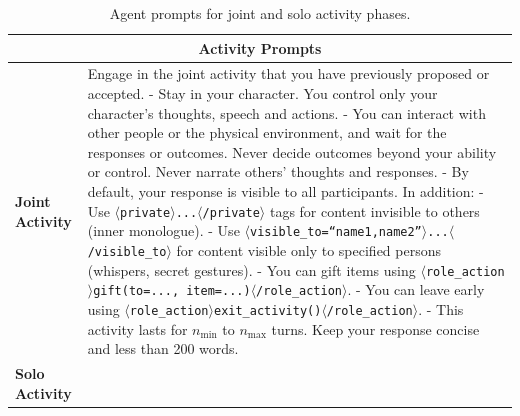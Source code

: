 \begin{table}[h]
\centering
\caption{Agent prompts for joint and solo activity phases.}
\label{tab:prompts_activity}
\begin{tabular}{p{0.8in}p{4.3in}}
\toprule
\multicolumn{2}{c}{\textbf{Activity Prompts}} \\
\midrule

\textbf{Joint \newline Activity} &

Engage in the joint activity that you have previously proposed or accepted.
\vspace{3pt}\newline
- Stay in your character. You control only your character's thoughts, speech and actions.
\newline - You can interact with other people or the physical environment, and wait for the responses or outcomes. Never decide outcomes beyond your ability or control. Never narrate others' thoughts and responses.
\newline - By default, your response is visible to all participants. In addition:
\newline \quad - Use \texttt{$\langle$private$\rangle$...$\langle$/private$\rangle$} tags for content invisible to others (inner monologue).
\newline \quad - Use \texttt{$\langle$visible\_to=``name1,name2''$\rangle$...$\langle$/visible\_to$\rangle$} for content visible only to specified persons (whispers, secret gestures).
\newline - You can gift items using \texttt{$\langle$role\_action$\rangle$gift(to=..., item=...)$\langle$/role\_action$\rangle$}.
\newline - You can leave early using \texttt{$\langle$role\_action$\rangle$exit\_activity()$\langle$/role\_action$\rangle$}.
\newline - This activity lasts for $n_{\min}$ to $n_{\max}$ turns. Keep your response concise and less than 200 words.

\\
\midrule

\textbf{Solo \newline Activity} &


\end{tabular}
\end{table}

